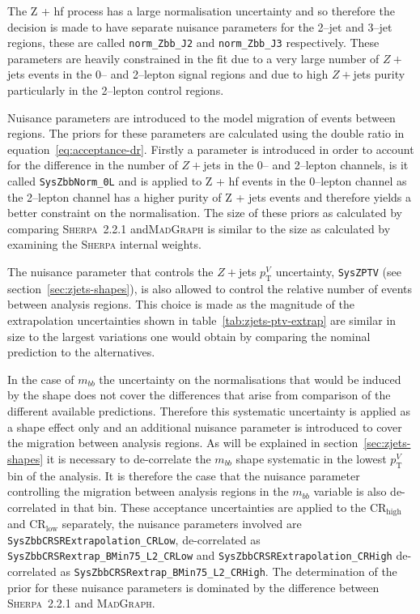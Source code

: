The Z + hf process has a large normalisation uncertainty and so therefore the
decision is made to have separate nuisance parameters for the 2--jet and 3--jet
regions, these are called \texttt{norm\_Zbb\_J2} and \texttt{norm\_Zbb\_J3}
respectively. These parameters are heavily constrained in the fit due to a very
large number of $Z+$jets events in the 0-- and 2--lepton signal regions and due
to high $Z+$jets purity particularly in the 2--lepton control regions.

Nuisance parameters are introduced to the model migration of events between
regions. The priors for these parameters are calculated using the double ratio
in equation~\ref{eq:acceptance-dr}. Firstly a parameter is introduced in order
to account for the difference in the number of $Z+$jets in the 0-- and 2--lepton
channels, is it called \texttt{SysZbbNorm\_0L} and is applied to Z + hf events
in the 0--lepton channel as the 2--lepton channel has a higher purity of Z +
jets events and therefore yields a better constraint on the normalisation. The
size of these priors as calculated by comparing \textsc{Sherpa}~2.2.1
and\textsc{MadGraph} is similar to the size as calculated by examining the
\textsc{Sherpa} internal weights.

The nuisance parameter that controls the $Z+$jets $p_{\mathrm{T}}^V$ uncertainty,
\texttt{SysZPTV} (see section~\ref{sec:zjets-shapes}), is also allowed to
control the relative number of events between analysis regions. This choice is
made as the magnitude of the extrapolation uncertainties shown in
table~\ref{tab:zjets-ptv-extrap} are similar in size to the largest variations
one would obtain by comparing the nominal prediction to the alternatives.


In the case of $m_{bb}$ the uncertainty on the normalisations that would be
induced by the shape does not cover the differences that arise from comparison
of the different available predictions. Therefore this systematic uncertainty is
applied as a shape effect only and an additional nuisance parameter is
introduced to cover the migration between analysis regions. As will be explained
in section~\ref{sec:zjets-shapes} it is necessary to de-correlate the $m_{bb}$
shape systematic in the lowest $p_{\mathrm{T}}^V$ bin of the analysis. It is therefore the
case that the nuisance parameter controlling the migration between analysis
regions in the $m_{bb}$ variable is also de-correlated in that bin. These
acceptance uncertainties are applied to the CR$_{\text{high}}$ and
CR$_{\text{low}}$ separately, the nuisance parameters involved are
\texttt{SysZbbCRSRExtrapolation\_CRLow}, de-correlated as
\texttt{SysZbbCRSRextrap\_BMin75\_L2\_CRLow} and
\texttt{SysZbbCRSRExtrapolation\_CRHigh} de-correlated as
\texttt{SysZbbCRSRextrap\_BMin75\_L2\_CRHigh}. The determination of the prior
for these nuisance parameters is dominated by the difference between
\textsc{Sherpa}~2.2.1 and \textsc{MadGraph}.

